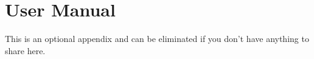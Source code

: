 \chapter{User Manual}

This is an optional appendix and can be eliminated if you don't have anything 
to share here.

